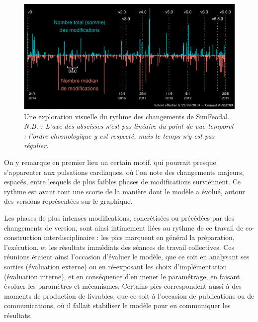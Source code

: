 
\begin{figure}[H]
	\includegraphics[width=1\linewidth]{img/explo_edits_code_clean.pdf}
	\caption[Temporalité du paramétrage du modèle.]{Une exploration visuelle du rythme des changements de SimFeodal.\\
		\textit{N.B. : L'axe des abscisses n'est pas linéaire du point de vue temporel : l'ordre chronologique y est respecté, mais le temps n'y est pas régulier.}
	}
	\label{fig:explo-edits-code}
\end{figure}

On y remarque en premier lieu un certain motif, qui pourrait presque s'apparenter aux pulsations cardiaques, où l'on note des changements majeurs, espacés, entre lesquels de plus faibles phases de modifications surviennent.
Ce \og rythme\fg{} est avant tout une scorie de la manière dont le modèle a évolué, autour des versions représentées sur le graphique.

Les phases de plus intenses modifications, concrétisées ou précédées par des changements de version, sont ainsi intimement liées au rythme de ce travail de co-construction interdisciplinaire : les pics marquent en général la préparation, l'exécution, et les résultats immédiats des séances de travail collectives.
Ces réunions étaient ainsi l'occasion d'évaluer le modèle, que ce soit en analysant ses sorties (évaluation externe) ou en ré-exposant les choix d'implémentation (évaluation interne), et en conséquence d'en mener le paramétrage, en faisant évoluer les paramètres et mécanismes.
Certains pics correspondent aussi à des moments de production de \og livrables\fg{}, que ce soit à l'occasion de publications ou de communications, où il fallait stabiliser le modèle pour en communiquer les résultats.

